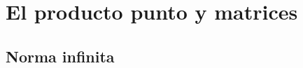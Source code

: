 \documentclass{article}
\begin{document}
\clearpage


\renewcommand{\figurename}{\textbf{Figura}}
\renewcommand{\tablename}{\textbf{Tabla}}
\renewcommand{\contentsname}{Tabla de contenidos}


\tableofcontents

\clearpage
 
 
\sloppy %

\section{El producto punto y matrices}

\subsection{Norma infinita}
\end{document}
